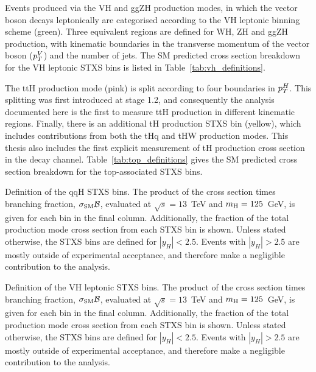 Events produced via the VH and ggZH production modes, in which the vector boson decays leptonically are categorised according to the VH leptonic binning scheme (green). Three equivalent regions are defined for WH, ZH and ggZH production, with kinematic boundaries in the transverse momentum of the vector boson ($p_T^V$) and the number of jets. The SM predicted cross section breakdown for the VH leptonic STXS bins is listed in Table~\ref{tab:vh_definitions}.

The ttH production mode (pink) is split according to four boundaries in $p_T^H$. This splitting was first introduced at stage 1.2, and consequently the \Hgg analysis documented here is the first to measure ttH production in different kinematic regions. Finally, there is an additional tH production STXS bin (yellow), which includes contributions from both the tHq and tHW production modes. This thesis also includes the first explicit measurement of tH production cross section in the \Hgg decay channel. Table~\ref{tab:top_definitions} gives the SM predicted cross section breakdown for the top-associated STXS bins.

\begin{table}[h]
    \caption[qqH STXS bin definitions]{Definition of the qqH STXS bins. The product of the cross section times \Hgg branching fraction, $\sigma_{\rm{SM}}\mathcal{B}$, evaluated at $\sqrt{s}=13$~TeV and $m_{\rm{H}}=125$~GeV, is given for each bin in the final column. Additionally, the fraction of the total production mode cross section from each STXS bin is shown. Unless stated otherwise, the STXS bins are defined for $|y_H|<2.5$. Events with $|y_H|>2.5$ are mostly outside of experimental acceptance, and therefore make a negligible contribution to the \Hgg analysis.}
    \label{tab:qqH_definitions}
    \centering
    \scriptsize
    \renewcommand{\arraystretch}{1.2}
    \setlength{\tabcolsep}{3pt}
    \hspace*{-3cm}
    
    \hspace*{-3cm}
\end{table}

\begin{table}
    \caption[VH leptonic STXS bin definitions]{Definition of the VH leptonic STXS bins. The product of the cross section times \Hgg branching fraction, $\sigma_{\rm{SM}}\mathcal{B}$, evaluated at $\sqrt{s}=13$~TeV and $m_{\rm{H}}=125$~GeV, is given for each bin in the final column. Additionally, the fraction of the total production mode cross section from each STXS bin is shown. Unless stated otherwise, the STXS bins are defined for $|y_H|<2.5$. Events with $|y_H|>2.5$ are mostly outside of experimental acceptance, and therefore make a negligible contribution to the \Hgg analysis.}
    \label{tab:vh_definitions}
    \centering
    \scriptsize
    \renewcommand{\arraystretch}{1.2}
    \setlength{\tabcolsep}{5pt}
    \hspace*{-2cm}
    
    \hspace*{-2cm}
\end{table}

